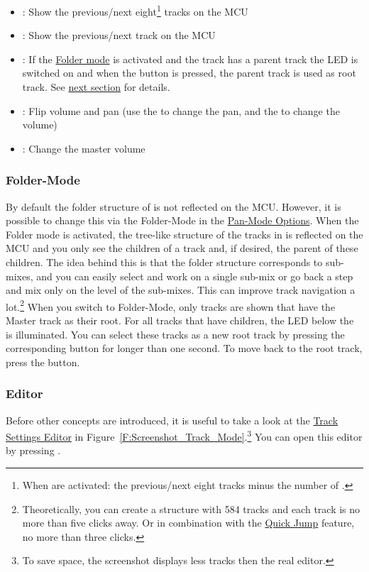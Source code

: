\begin{itemize}
\item \bankdu: Show the previous/next eight\footnote{When
\anchors are activated: the previous/next eight tracks minus the
number of \anchors.} tracks on the MCU

\item \channeldu: Show the previous/next track on the MCU

\item \gv: If the \hyperref[foldermode]{Folder mode} is activated and the
track has a parent track the LED is switched on and when the button is pressed,
the parent track is used as root track. See \hyperref[foldermode]{next
section} for details.

\item \flip: Flip volume and pan (use the \faders to change the pan, and the
\vpots to change the volume)

\item \mfader: Change the master volume
\end{itemize}

\noindent

\subsubsection{Folder-Mode}\label{foldermode}
By default the folder structure of \reaper is not reflected on the
MCU. However, it is possible to change this via the Folder-Mode
\attribute in the \hyperref[T:multitrack_options1]{Pan-Mode
  Options}. When the Folder mode is activated, the tree-like structure
of the tracks in \reaper is reflected on the MCU and you only see the
children of a track and, if desired, the parent of these children. The
idea behind this is that the folder structure corresponds to
sub-mixes, and you can easily select and work on a single sub-mix or
go back a step and mix only on the level of the sub-mixes. This can
improve track navigation a lot.\footnote{Theoretically, you can create a
  structure with 584 tracks and each track is no more than five clicks
  away. Or in combination with the \hyperref[quickjump]{Quick Jump}
  feature, no more than three clicks.} When you switch to Folder-Mode, only
tracks are shown that have the Master track as their root. For all
tracks that have children, the LED below the \vpot is illuminated. You can
select these tracks as a new root track by pressing the
corresponding \select button for longer than one second. To move back to
the root track, press the \gv button.

\subsubsection{Editor}\label{panmodeeditor}
Before other concepts are introduced, it is useful to take a look at the
\hyperref[F:Screenshot_Track_Mode]{Track Settings Editor} in
Figure~\ref{F:Screenshot_Track_Mode}.\footnote{To save space, the screenshot
displays less tracks then the real editor.} You can open this editor by pressing
\alt \pan. 

